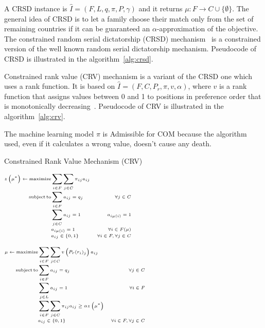 \FloatBarrier

A CRSD instance is \(\hat {I} = (F, L, q, \pi, P, \gamma)\) and it returns \(\mu : F \rightarrow C \cup \{\emptyset\}\).
The general idea of CRSD is to let a family choose their match only from the set of remaining countries if it can be guaranteed an \(\alpha\)-approximation of the objective.
The constrained random serial dictatorship (CRSD) mechanism~\cite{bansak_2018} is a constrained version of the well known random serial dictatorship mechanism.
Pseudocode of CRSD is illustrated in the algorithm~\ref{alg:crsd}.

Constrained rank value (CRV) mechanism is a variant of the CRSD one which uses a rank function.
It is based on \(\hat {I} = ( F , C , P_r , \pi  ,v, \alpha )\), where \(v\) is a rank function that assigns values between 0 and 1 to positions in preference order that is monotonically decreasing~\cite{olbergml}.
Pseudocode of CRV is illustrated in the algorithm~\ref{alg:crv}.

The machine learning model \(\pi\) is Admissible for COM because the algorithm used, even if it calculates a wrong value, doesn’t cause any death.

\begin{algorithm}
    \caption{Constrained Rank Value Mechanism (CRV)}\label{alg:crv}
    \KwResult{\(\mu\)}
    \(\tiny
        \begin{aligned}
            z \left( \mu ^ { * } \right) \leftarrow \operatorname{maximize} & \sum_{i \in F} \sum_{j \in C} \pi_{i j} a_{i j} \\[-1mm]
            \operatorname {subject}\operatorname{to} & \sum_{i \in F} a_{i j}=q_{j} & \forall j \in C \\[-1mm]
            & \sum_{j \in C} a_{i j}=1 & a_{i \mu(i)}=1 \\[-1mm]
            & a_{i\mu (i)} = 1 &  \forall i \in F(\mu) \\[-1mm]
            & a_{i j} \in\{0,1\} & \forall i \in F, \forall j \in C
        \end{aligned}
    \)%

    \(\tiny
        \begin{aligned}
            \mu \leftarrow \operatorname{maximize} & \sum_{i \in F} \sum_{j \in C} v\left(P_r(r_i)_j\right) a_{i j} \\[-1mm]
            \operatorname {subject}\operatorname{to} & \sum_{i \in F} a_{i j}=q_{j} & \forall j \in C \\[-1mm]
            & \sum_{j \in L} a_{i j}=1 & \forall i \in F \\[-1mm]
            & \sum_{i \in F} \sum_{j \in C} \pi_{i j} a_{i j} \geq \alpha z \left( \mu ^ { * } \right) \\[-1mm]
            & a_{i j} \in\{0,1\} & \forall i \in F, \forall j \in C
        \end{aligned}
    \)%

\end{algorithm}


